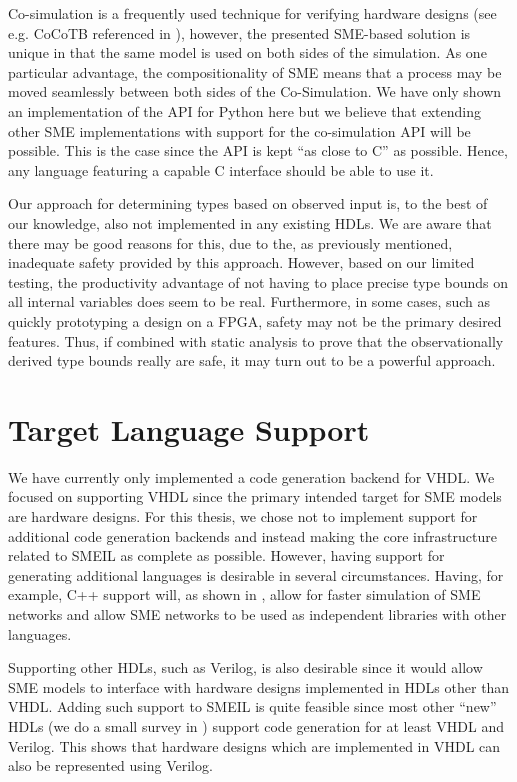 Co-simulation is a frequently used technique for verifying hardware designs (see
e.g. CoCoTB referenced in ), however, the presented SME-based
solution is unique in that the same model is used on both sides of the
simulation. As one particular advantage, the compositionality of SME means that
a process may be moved seamlessly between both sides of the Co-Simulation.  We
have only shown an implementation of the API for Python here but we believe that
extending other SME implementations with support for the \libsme co-simulation
API will be possible. This is the case since the API is kept ``as close to C''
as possible. Hence, any language featuring a capable C interface should be able
to use it.


Our approach for determining types based on observed input is, to the best of
our knowledge, also not implemented in any existing HDLs. We are aware that
there may be good reasons for this, due to the, as previously mentioned,
inadequate safety provided by this approach. However, based on our limited
testing, the productivity advantage of not having to place precise type bounds
on all internal variables does seem to be real. Furthermore, in some cases, such
as quickly prototyping a design on a FPGA, safety may not be the primary desired
features. Thus, if combined with static analysis to prove that the
observationally derived type bounds really are safe, it may turn out to be a
powerful approach.

\section{Target Language Support}
We have currently only implemented a code generation backend for VHDL. We
focused on supporting VHDL since the primary intended target for SME models are
hardware designs. For this thesis, we chose not to implement support for
additional code generation backends and instead making the core infrastructure
related to SMEIL as complete as possible. However, having support for generating
additional languages is desirable in several circumstances. Having, for example,
C++ support will, as shown in \cite{skovhede2017c++}, allow for faster
simulation of SME networks and allow SME networks to be used as independent
libraries with other languages.

Supporting other HDLs, such as Verilog, is also desirable since it would allow
SME models to interface with hardware designs implemented in HDLs other than
VHDL. Adding such support to SMEIL is quite feasible since most other ``new''
HDLs (we do a small survey in ) support code generation for at
least VHDL and Verilog. This shows that hardware designs which are implemented
in VHDL can also be represented using Verilog.

